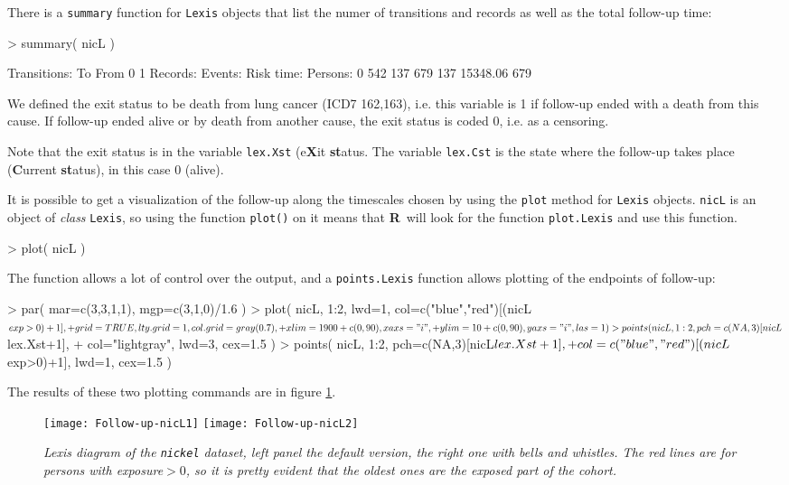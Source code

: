 \documentclass[a4paper,twoside,12pt]{article}
\newcommand{\R}{\textsf{\bf R}}
\begin{document}
There is a \texttt{summary} function for \texttt{Lexis} objects that
list the numer of transitions and records as well as the total
follow-up time:
\begin{Schunk}
\begin{Sinput}
> summary( nicL )
\end{Sinput}
\begin{Soutput}
Transitions:
     To
From   0   1  Records:  Events: Risk time:  Persons:
   0 542 137       679      137   15348.06       679
\end{Soutput}
\end{Schunk}
We defined the exit status to be death from lung cancer (ICD7
162,163), i.e. this variable is 1 if follow-up ended with a death from
this cause. If follow-up ended alive or by death from another cause,
the exit status is coded 0, i.e. as a censoring.

Note that the exit status is in the variable \texttt{lex.Xst}
(e\textbf{X}it \textbf{st}atus. The variable \texttt{lex.Cst} is the
state where the follow-up takes place (\textbf{C}urrent
\textbf{st}atus), in this case 0 (alive).

It is possible to get a visualization of the follow-up along the
timescales chosen by using the \texttt{plot} method for \texttt{Lexis}
objects. \texttt{nicL} is an object of \emph{class} \texttt{Lexis}, so
using the function \texttt{plot()} on it means that \R\ will look for
the function \texttt{plot.Lexis} and use this function.
\begin{Schunk}
\begin{Sinput}
> plot( nicL )
\end{Sinput}
\end{Schunk}
The function allows a lot of control over the output, and a
\texttt{points.Lexis} function allows plotting of the endpoints of
follow-up:
\begin{Schunk}
\begin{Sinput}
> par( mar=c(3,3,1,1), mgp=c(3,1,0)/1.6 )
> plot( nicL, 1:2, lwd=1, col=c("blue","red")[(nicL$exp>0)+1],
+       grid=TRUE, lty.grid=1, col.grid=gray(0.7),
+       xlim=1900+c(0,90), xaxs="i",
+       ylim=  10+c(0,90), yaxs="i", las=1 )
> points( nicL, 1:2, pch=c(NA,3)[nicL$lex.Xst+1],
+         col="lightgray", lwd=3, cex=1.5 )
> points( nicL, 1:2, pch=c(NA,3)[nicL$lex.Xst+1],
+         col=c("blue","red")[(nicL$exp>0)+1], lwd=1, cex=1.5 )
\end{Sinput}
\end{Schunk}
The results of these two plotting commands are in figure \ref{fig:Lexis-diagram}.
\begin{figure}[tb]
\centering
\label{fig:Lexis-diagram}
\texttt{[image: Follow-up-nicL1]}
\texttt{[image: Follow-up-nicL2]}
\caption{\it Lexis diagram of the \texttt{nickel} dataset, left panel
  the default version, the right one with bells
  and whistles. The red lines are for persons with exposure$>0$, so it
  is pretty evident that the oldest ones are the exposed part of the
  cohort.}
\end{figure}
\end{document}
